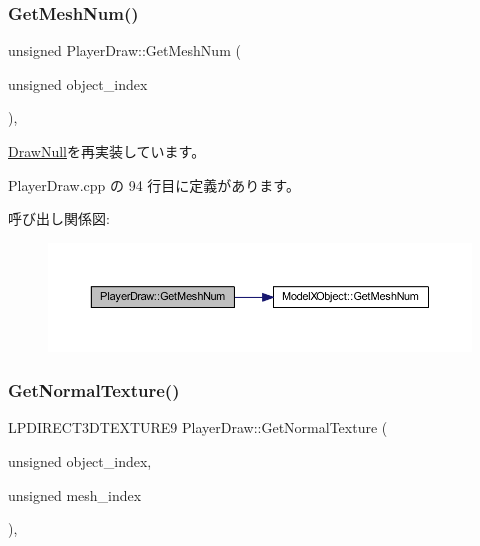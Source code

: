 \subsubsection{\texorpdfstring{Get\+Mesh\+Num()}{GetMeshNum()}}
{\footnotesize\ttfamily unsigned Player\+Draw\+::\+Get\+Mesh\+Num (\begin{DoxyParamCaption}\item[{unsigned}]{object\+\_\+index }\end{DoxyParamCaption})\hspace{0.3cm}{\ttfamily [override]}, {\ttfamily [virtual]}}



\mbox{\hyperlink{class_draw_null_ad735978a85a5f3583eecd82d6bfe6413}{Draw\+Null}}を再実装しています。



 Player\+Draw.\+cpp の 94 行目に定義があります。

呼び出し関係図\+:\nopagebreak
\begin{figure}[H]
\begin{center}
\leavevmode
\includegraphics[width=350pt]{class_player_draw_ad9e2e09a32c7474fcea5e7e24e22bc71_cgraph}
\end{center}
\end{figure}
\mbox{\label{class_player_draw_abb93b530e38fc224ecbfe17d623f10fb}} 
\subsubsection{\texorpdfstring{Get\+Normal\+Texture()}{GetNormalTexture()}}
{\footnotesize\ttfamily L\+P\+D\+I\+R\+E\+C\+T3\+D\+T\+E\+X\+T\+U\+R\+E9 Player\+Draw\+::\+Get\+Normal\+Texture (\begin{DoxyParamCaption}\item[{unsigned}]{object\+\_\+index,  }\item[{unsigned}]{mesh\+\_\+index }\end{DoxyParamCaption})\hspace{0.3cm}{\ttfamily [override]}, {\ttfamily [virtual]}}



